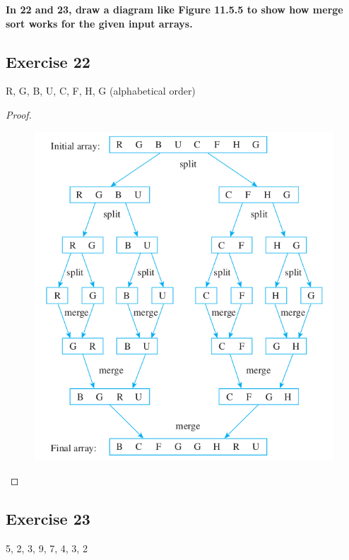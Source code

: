 \documentclass[14pt]{extarticle}
\newcommand{\cy}{\color{cyan}}
\begin{document}
{\bf \cy In 22 and 23, draw a diagram like Figure 11.5.5 to show how merge sort works for the given input arrays.}

\subsection{Exercise 22}
R, G, B, U, C, F, H, G (alphabetical order)

\begin{proof}
\begin{figure}[ht!]
\centering
\includegraphics[scale=0.5]{../images/11.5.22.png}
\end{figure}
\end{proof}

\subsection{Exercise 23}
5, 2, 3, 9, 7, 4, 3, 2
\end{document}
